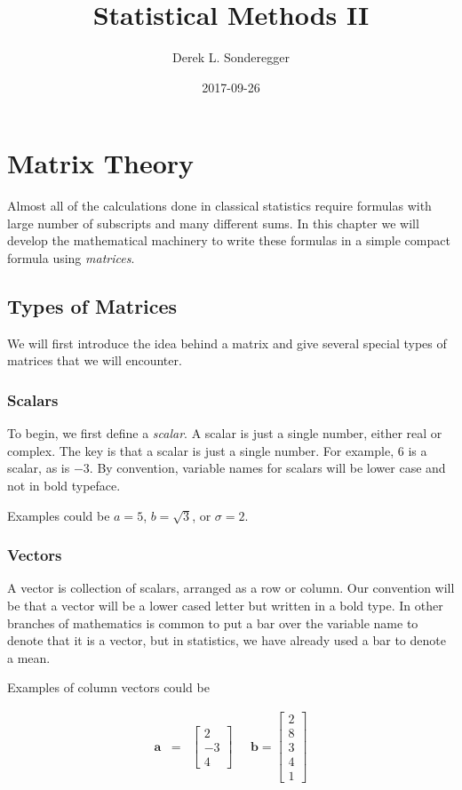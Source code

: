 \documentclass[]{book}
\title{Statistical Methods II}
\author{Derek L. Sonderegger}
\date{2017-09-26}
\theoremstyle{definition}
\theoremstyle{definition}
\theoremstyle{remark}
\begin{document}
\maketitle

{
\setcounter{tocdepth}{1}
\tableofcontents
}
\chapter{Matrix Theory}\label{matrix-theory}

Almost all of the calculations done in classical statistics require
formulas with large number of subscripts and many different sums. In
this chapter we will develop the mathematical machinery to write these
formulas in a simple compact formula using \emph{matrices}.

\section{Types of Matrices}\label{types-of-matrices}

We will first introduce the idea behind a matrix and give several
special types of matrices that we will encounter.

\subsection{Scalars}\label{scalars}

To begin, we first define a \emph{scalar}. A scalar is just a single
number, either real or complex. The key is that a scalar is just a
single number. For example, \(6\) is a scalar, as is \(-3\). By
convention, variable names for scalars will be lower case and not in
bold typeface.

Examples could be \(a=5\), \(b=\sqrt{3}\), or \(\sigma=2\).

\subsection{Vectors}\label{vectors}

A vector is collection of scalars, arranged as a row or column. Our
convention will be that a vector will be a lower cased letter but
written in a bold type. In other branches of mathematics is common to
put a bar over the variable name to denote that it is a vector, but in
statistics, we have already used a bar to denote a mean.

Examples of column vectors could be

\begin{eqnarray*}
\boldsymbol{a} & = & \left[\begin{array}{c}
2\\
-3\\
4
\end{array}\right]\;\;\;\;\;\boldsymbol{b}=\left[\begin{array}{c}
2\\
8\\
3\\
4\\
1
\end{array}\right]
\end{eqnarray*}
\end{document}
